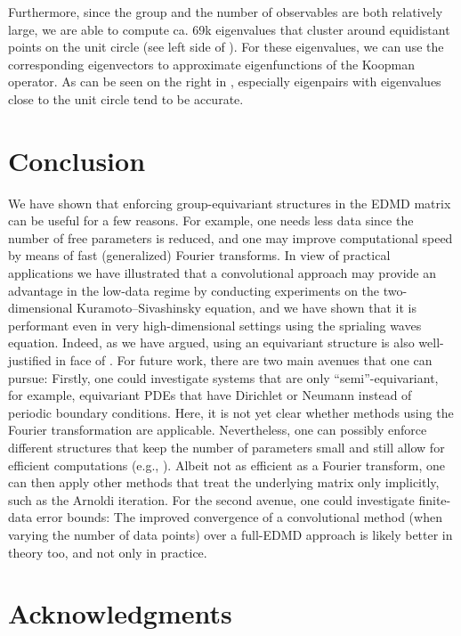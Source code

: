 \documentclass[preprint,12pt,authoryear]{elsarticle}
\begin{document}
{Furthermore, since the group and the number of observables are both relatively large, we are able to compute ca. 69k eigenvalues that cluster around equidistant points on the unit circle (see left side of ). For these eigenvalues, we can use the corresponding eigenvectors to approximate eigenfunctions of the Koopman operator. As can be seen on the right in , especially eigenpairs with eigenvalues close to the unit circle tend to be accurate.



\section{Conclusion}

We have shown that enforcing group-equivariant structures in the EDMD matrix can be useful for a few reasons. For example, one needs less data since the number of free parameters is reduced, and one may improve computational speed by means of fast (generalized) Fourier transforms. %
In view of practical applications we have illustrated that a convolutional approach may provide an advantage in the low-data regime by conducting experiments on the two-dimensional Kuramoto--Sivashinsky equation, and we have shown that it is performant even in very high-dimensional settings using the sprialing waves equation. Indeed, as we have argued, using an equivariant structure is also well-justified in face of .
For future work, there are two main avenues that one can pursue: Firstly, one could investigate systems that are only ``semi''-equivariant, for example, equivariant PDEs that have Dirichlet or Neumann instead of periodic boundary conditions. Here, it is not yet clear whether methods using the Fourier transformation are applicable. Nevertheless, one can possibly enforce different structures that keep the number of parameters small and still allow for efficient computations (e.g., \cite{baddooPhysicsinformedDynamicMode2023}). Albeit not as efficient as a Fourier transform, one can then apply other methods that treat the underlying matrix only implicitly, such as the Arnoldi iteration.
For the second avenue, one could investigate finite-data error bounds: The improved convergence of a convolutional method (when varying the number of data points) over a full-EDMD approach is likely better in theory too, and not only in practice.

\section{Acknowledgments}

}
\end{document}
